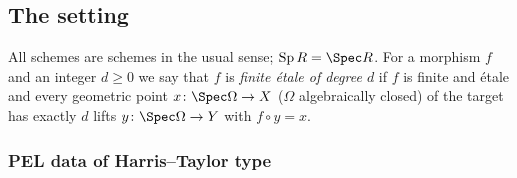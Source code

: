 \subsection{The setting}\label{pf:ks2:sec:setting}

All schemes are schemes in the usual sense; $\mathrm{Sp}\,R=\Spec R$. For a morphism $f$ and an
integer $d\ge0$ we say that $f$ is \emph{finite \'etale of degree $d$} if $f$ is finite and
\'etale and every geometric point $x\colon\Spec\Omega\to X$ ($\Omega$ algebraically closed) of the
target has exactly $d$ lifts $y\colon\Spec\Omega\to Y$ with $f\circ y=x$.

\subsubsection{PEL data of Harris--Taylor type}

